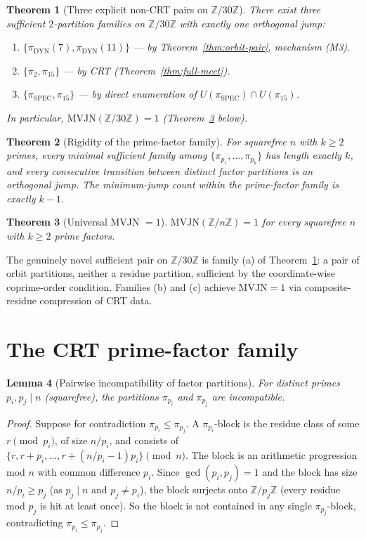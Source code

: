 \documentclass[11pt,reqno]{amsart}
\theoremstyle{plain}
\newtheorem{theorem}{Theorem}
\newtheorem{lemma}[theorem]{Lemma}
\theoremstyle{definition}
\newcommand{\Z}{\mathbb{Z}}
\newcommand{\Zn}{\Z/n\Z}
\newcommand{\DYN}{\mathrm{DYN}}
\newcommand{\SPEC}{\mathrm{SPEC}}
\newcommand{\MVJN}{\mathrm{MVJN}}
\begin{document}
\begin{theorem}[Three explicit non-CRT pairs on $\Z/30\Z$] \label{thm:n30}
There exist three sufficient $2$-partition families on $\Z/30\Z$ with exactly one orthogonal jump:
\begin{enumerate}[label=\textup{(\alph*)}]
\item $\{\pi_{\DYN}(7), \pi_{\DYN}(11)\}$ --- by Theorem~\ref{thm:orbit-pair}, mechanism \textup{(M3)}.
\item $\{\pi_2, \pi_{15}\}$ --- by CRT (Theorem~\ref{thm:full-meet}).
\item $\{\pi_{\SPEC}, \pi_{15}\}$ --- by direct enumeration of $U(\pi_{\SPEC}) \cap U(\pi_{15})$.
\end{enumerate}
In particular, $\MVJN(\Z/30\Z) = 1$ (Theorem~\ref{thm:MVJN} below).
\end{theorem}

\begin{theorem}[Rigidity of the prime-factor family] \label{thm:rigid}
For squarefree $n$ with $k \geq 2$ primes, every minimal sufficient family among $\{\pi_{p_1}, \ldots, \pi_{p_k}\}$ has length exactly $k$, and every consecutive transition between distinct factor partitions is an orthogonal jump. The minimum-jump count within the prime-factor family is exactly $k - 1$.
\end{theorem}

\begin{theorem}[Universal MVJN $= 1$] \label{thm:MVJN}
$\MVJN(\Zn) = 1$ for every squarefree $n$ with $k \geq 2$ prime factors.
\end{theorem}

The genuinely novel sufficient pair on $\Z/30\Z$ is family (a) of Theorem~\ref{thm:n30}: a pair of orbit partitions, neither a residue partition, sufficient by the coordinate-wise coprime-order condition. Families (b) and (c) achieve $\MVJN = 1$ via composite-residue compression of CRT data.

\section{The CRT prime-factor family}

\begin{lemma}[Pairwise incompatibility of factor partitions] \label{lem:pwise-incomp}
For distinct primes $p_i, p_j \mid n$ (squarefree), the partitions $\pi_{p_i}$ and $\pi_{p_j}$ are incompatible.
\end{lemma}

\begin{proof}
Suppose for contradiction $\pi_{p_i} \leq \pi_{p_j}$. A $\pi_{p_i}$-block is the residue class of some $r \pmod {p_i}$, of size $n/p_i$, and consists of $\{r, r + p_i, \ldots, r + (n/p_i - 1) p_i\} \pmod n$. The block is an arithmetic progression mod $n$ with common difference $p_i$. Since $\gcd(p_i, p_j) = 1$ and the block has size $n/p_i \geq p_j$ (as $p_j \mid n$ and $p_j \neq p_i$), the block surjects onto $\Z/p_j\Z$ (every residue mod $p_j$ is hit at least once). So the block is not contained in any single $\pi_{p_j}$-block, contradicting $\pi_{p_i} \leq \pi_{p_j}$.
\end{proof}
\end{document}

